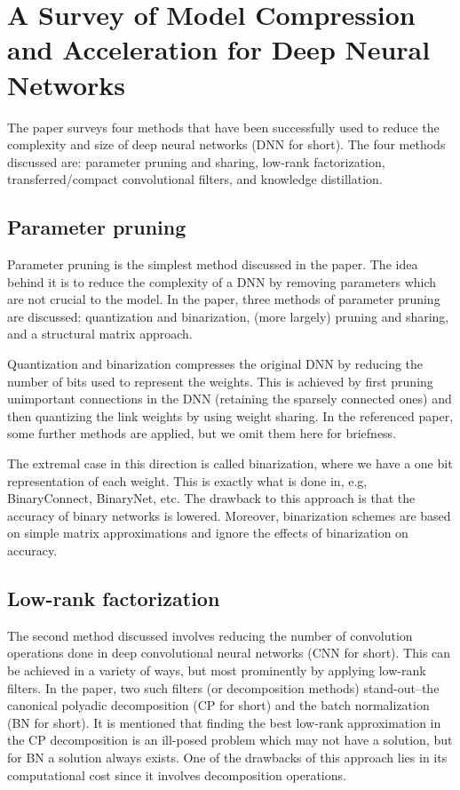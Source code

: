 \section{A Survey of Model Compression and Acceleration for Deep Neural Networks}
The paper surveys four methods that have been successfully used to reduce the
complexity and size of deep neural networks (DNN for short).
The four methods discussed are: parameter pruning and sharing, low-rank
factorization, transferred/compact convolutional filters, and knowledge
distillation.

\subsection{Parameter pruning}
Parameter pruning is the simplest method discussed in the paper. The idea behind
it is to reduce the complexity of a DNN by removing parameters which are not
crucial to the model. In the paper, three methods of parameter pruning are
discussed: quantization and binarization, (more largely) pruning and sharing,
and a structural matrix approach.

Quantization and binarization compresses the original DNN by reducing the number
of bits used to represent the weights. This is achieved by first pruning
unimportant connections in the DNN (retaining the sparsely connected ones) and
then quantizing the link weights by using weight sharing. In the referenced
paper, some further methods are applied, but we omit them here for briefness.

The extremal case in this direction is called binarization, where we have a one
bit representation of each weight. This is exactly what is done in, e.g,
BinaryConnect, BinaryNet, etc. The drawback to this approach is that the
accuracy of binary networks is lowered. Moreover, binarization schemes are based
on simple matrix approximations and ignore the effects of binarization on
accuracy.

\subsection{Low-rank factorization}
The second method discussed involves reducing the number of convolution
operations done in deep convolutional neural networks (CNN for short). This can
be achieved in a variety of ways, but most prominently by applying low-rank
filters. In the paper, two such filters (or decomposition methods)
stand-out--the canonical polyadic decomposition (CP for short) and the batch
normalization (BN for short). It is mentioned that finding the best low-rank
approximation in the CP decomposition is an ill-posed problem which may not have
a solution, but for BN a solution always exists. One of the drawbacks of this
approach lies in its computational cost since it involves decomposition
operations.

